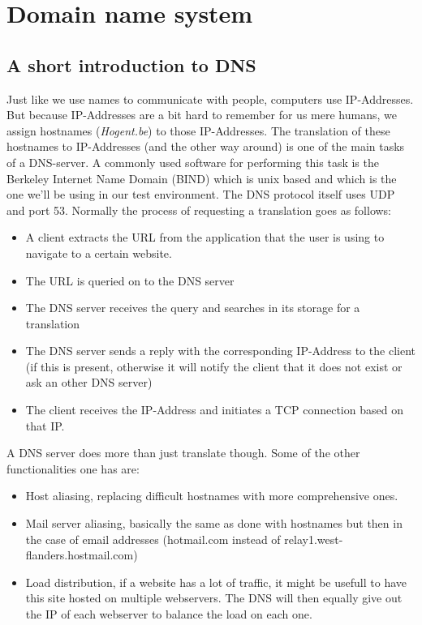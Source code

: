 \section{ Domain name system}
\subsection{A short introduction to DNS}
Just like we use names to communicate with people, computers use IP-Addresses. But because IP-Addresses are a bit hard to remember for us mere humans, we assign hostnames (\textit{Hogent.be}) to those IP-Addresses. The translation of these hostnames to IP-Addresses (and the other way around) is one of the main tasks of a DNS-server. A commonly used software for performing this task is the Berkeley Internet Name Domain (BIND) which is unix based and which is the one we'll be using in our test environment. The DNS protocol itself uses UDP and port 53. Normally the process of requesting a translation goes as follows:
\begin{itemize}
\item A client extracts the URL from the application that the user is using to navigate to a certain website.
\item The URL is queried on to the DNS server
\item The DNS server receives the query and searches in its storage for a translation
\item The DNS server sends a reply with the corresponding IP-Address to the client (if this is present, otherwise it will notify the client that it does not exist or ask an other DNS server)
\item The client receives the IP-Address and initiates a TCP connection based on that IP.
\end{itemize}
A DNS server does more than just translate though. Some of the other functionalities one has are:
\begin{itemize}
\item Host aliasing, replacing difficult hostnames with more comprehensive ones.
\item Mail server aliasing, basically the same as done with hostnames but then in the case of email addresses (hotmail.com instead of relay1.west-flanders.hostmail.com)
\item Load distribution, if a website has a lot of traffic, it might be usefull to have this site hosted on multiple webservers. The DNS will then equally give out the IP of each webserver to balance the load on each one.
\end{itemize}
